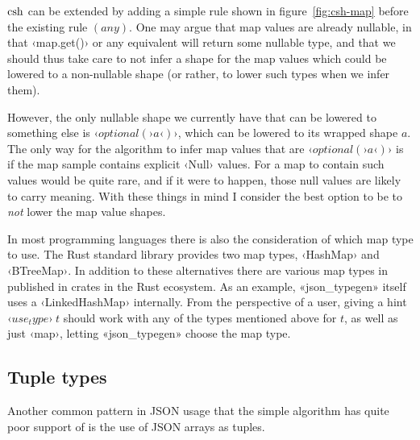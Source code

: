 $\operatorname{csh}$ can be extended by adding a simple rule shown in figure~\ref{fig:csh-map} before the existing rule $(any)$. One may argue that map values are already nullable, in that ‹map.get()› or any equivalent will return some nullable type, and that we should thus take care to not infer a shape for the map values which could be lowered to a non-nullable shape (or rather, to lower such types when we infer them).

However, the only nullable shape we currently have that can be lowered to something else is $‹optional(›a‹)›$, which can be lowered to its wrapped shape $a$. The only way for the algorithm to infer map values that are $‹optional(›a‹)›$ is if the map sample contains explicit ‹Null› values. For a map to contain such values would be quite rare, and if it were to happen, those null values are likely to carry meaning. With these things in mind I consider the best option to be to \emph{not} lower the map value shapes.

In most programming languages there is also the consideration of which map type to use. The Rust standard library provides two map types, ‹HashMap› and ‹BTreeMap›. In addition to these alternatives there are various map types in published in crates in the Rust ecosystem. As an example, «json_typegen» itself uses a ‹LinkedHashMap› internally. From the perspective of a user, giving a hint $‹use_type›\ t$ should work with any of the types mentioned above for $t$, as well as just ‹map›, letting «json_typegen» choose the map type.



\subsection{Tuple types}

Another common pattern in JSON usage that the simple algorithm has quite poor support of is the use of JSON arrays as tuples.


